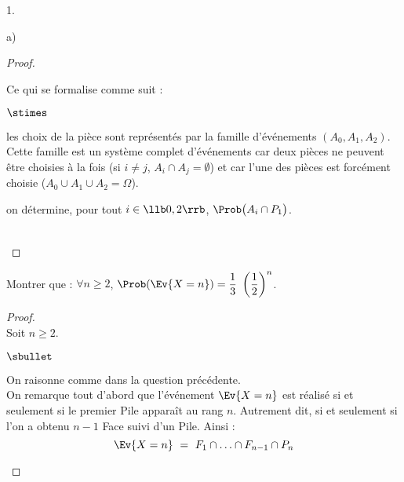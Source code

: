 \begin{noliste}{1.}
\begin{noliste}{a)}
\begin{proof}
\begin{remark}
        Ce qui se formalise comme suit :
        \begin{noliste}{$\stimes$}
        \item les choix de la pièce sont représentés par la famille
          d'événements $(A_0, A_1, A_2)$.\\
          Cette famille est un système complet d'événements car deux
          pièces ne peuvent être choisies à la fois (si $i \neq j$,
          $A_i \cap A_j = \emptyset$) et car l'une des pièces est
          forcément choisie ($A_0 \cup A_1 \cup A_2 = \Omega$).
        \item on détermine, pour tout $i \in \llb 0, 2 \rrb$,
          $\Prob\big( A_i \cap P_1 \big)$.
        \end{noliste}
      \end{remark}~\\[-1.4cm]
    \end{proof}
    

\newpage


  \item Montrer que : $\forall n \geq 2$, $\Prob(\Ev{X = n}) =
    \dfrac{1}{3} \ \left( \dfrac{1}{2} \right)^n$.

    \begin{proof}~\\%
      Soit $n \geq 2$.
      \begin{noliste}{$\sbullet$}
      \item On raisonne comme dans la question précédente.\\
        On remarque tout d'abord que l'événement $\Ev{X = n}$ est
        réalisé si et seulement si le premier Pile apparaît au rang
        $n$. Autrement dit, si et seulement si l'on a obtenu $n-1$
        Face suivi d'un Pile. Ainsi :
        \[
        \Ev{X = n} \ = \ F_1 \cap \ldots \cap F_{n-1} \cap P_n
        \]


\end{noliste}
\end{proof}
\end{noliste}
\end{noliste}
